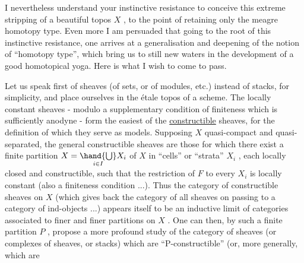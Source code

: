 
I nevertheless understand your instinctive resistance to
conceive this extreme stripping of a beautiful topos $X$ , to the
point of retaining only the meagre homotopy type. Even more I
am persuaded that going to the root of this instinctive resistance,
one arrives at a generalisation and deepening of the notion of
``homotopy type'', which bring us to still new waters in the
development of a good homotopical yoga. Here is what I wish to
come to pass.

Let us speak first of sheaves (of sets, or of modules, etc.)
instead of stacks, for simplicity, and place ourselves in the
étale topos of a scheme. The locally constant sheaves - modulo
a supplementary condition of finiteness which is sufficiently
anodyne - form the easiest of the \uline{constructible} sheaves, for
the definition of which they serve as models. Supposing $X$
quasi-compact and quasi-separated, the general constructible
sheaves are those for which there exist a finite partition
$X = \underset{i\in I}{\hand{\bigcup}} X_i$ of $X$ in ``cells'' or ``strata'' $X_i$ , each locally
closed and constructible, such that the restriction of $F$ to
every $X_i$ is locally constant (also a finiteness condition ...).
Thus the category of constructible sheaves on $X$ (which gives
back the category of all sheaves on passing to a category of
ind-objects ...) appears itself to be an inductive limit of
categories associated to finer and finer partitions on $X$ . One
can then, by such a finite partition $P$ , propose a more profound
study of the category of sheaves (or complexes of sheaves, or
stacks) which are ``P-constructible'' (or, more generally, which are

